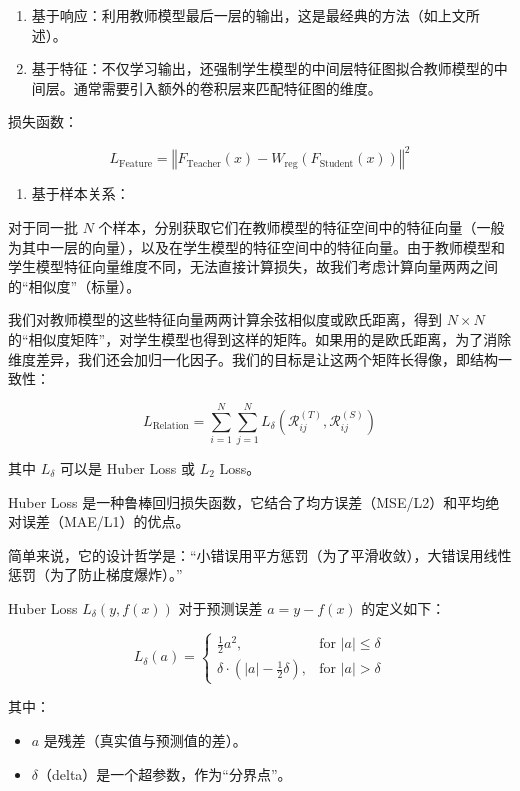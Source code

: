 \begin{enumerate}
\def\labelenumi{\arabic{enumi}.}
\item
  基于响应：利用教师模型最后一层的输出，这是最经典的方法（如上文所述）。
\item
  基于特征：不仅学习输出，还强制学生模型的中间层特征图拟合教师模型的中间层。通常需要引入额外的卷积层来匹配特征图的维度。
\end{enumerate}

损失函数：

\[
L_{\mathrm{Feature}} = \left\Vert F_{\mathrm{Teacher}}(x) - W_{\mathrm{reg}}\left(F_{\mathrm{Student}}(x)\right) \right\Vert^2
\]

\begin{enumerate}
\def\labelenumi{\arabic{enumi}.}
\setcounter{enumi}{2}
\tightlist
\item
  基于样本关系：
\end{enumerate}

对于同一批 \(N\) 个样本，分别获取它们在教师模型的特征空间中的特征向量（一般为其中一层的向量），以及在学生模型的特征空间中的特征向量。由于教师模型和学生模型特征向量维度不同，无法直接计算损失，故我们考虑计算向量两两之间的``相似度''（标量）。

我们对教师模型的这些特征向量两两计算余弦相似度或欧氏距离，得到 \(N \times N\) 的``相似度矩阵''，对学生模型也得到这样的矩阵。如果用的是欧氏距离，为了消除维度差异，我们还会加归一化因子。我们的目标是让这两个矩阵长得像，即结构一致性：

\[
L_{\mathrm{Relation}} = \sum_{i=1}^{N} \sum_{j=1}^{N} L_\delta\left(\mathcal{R}_{ij}^{(T)}, \mathcal{R}_{ij}^{(S)}\right)
\]

其中 \(L_\delta\) 可以是 Huber Loss 或 \(L_2\) Loss。

Huber Loss 是一种鲁棒回归损失函数，它结合了均方误差（MSE/L2）和平均绝对误差（MAE/L1）的优点。

简单来说，它的设计哲学是：``小错误用平方惩罚（为了平滑收敛），大错误用线性惩罚（为了防止梯度爆炸）。''

Huber Loss \(L_\delta(y, f(x))\) 对于预测误差 \(a = y - f(x)\) 的定义如下：

\[
L_\delta(a) =
\begin{cases}
\frac{1}{2}a^2, & \text{for } |a| \le \delta \\
\delta \cdot \left(|a| - \frac{1}{2}\delta\right), & \text{for } |a| > \delta
\end{cases}
\]

其中：

\begin{itemize}
\tightlist
\item
  \(a\) 是残差（真实值与预测值的差）。
\item
  \(\delta\)（delta）是一个超参数，作为``分界点''。
\end{itemize}

